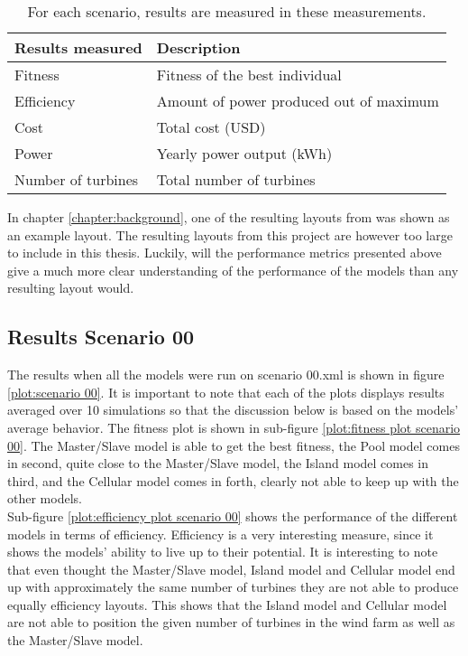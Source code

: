 \begin{table}[h!]
\centering
\caption{For each scenario, results are measured in these measurements.}
\label{table:performance metrics}
\centering
\begin{tabular}{l|l}
\textbf{Results measured}   & \textbf{Description} \\
\hline
Fitness                     & Fitness of the best individual \\
Efficiency                  & Amount of power produced out of maximum \\
Cost                        & Total cost (USD)\\
Power                       & Yearly power output (kWh) \\
Number of turbines          & Total number of turbines
\end{tabular}
\end{table}

\noindent In chapter \ref{chapter:background}, one of the resulting layouts from \citep{Grady} was shown as an example layout. The resulting layouts from this project are however too large to include in this thesis. Luckily, will the performance metrics presented above give a much more clear understanding of the performance of the models than any resulting layout would. \\


\subsection{Results Scenario 00}
The results when all the models were run on scenario 00.xml is shown in figure \ref{plot:scenario 00}. It is important to note that each of the plots displays results averaged over 10 simulations so that the discussion below is based on the models' average behavior. The fitness plot is shown in sub-figure \ref{plot:fitness plot scenario 00}. The Master/Slave model is able to get the best fitness, the Pool model comes in second, quite close to the Master/Slave model, the Island model comes in third, and the Cellular model comes in forth, clearly not able to keep up with the other models.\\ 

\noindent Sub-figure \ref{plot:efficiency plot scenario 00} shows the performance of the different models in terms of efficiency. Efficiency is a very interesting measure, since it shows the models' ability to live up to their potential. It is interesting to note that even thought the Master/Slave model, Island model and Cellular model end up with approximately the same number of turbines they are not able to produce equally efficiency layouts. This shows that the Island model and Cellular model are not able to position the given number of turbines in the wind farm as well as the Master/Slave model.\\

